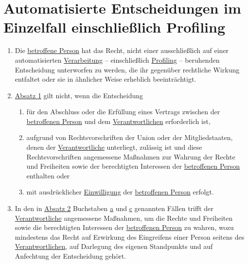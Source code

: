 \chapter{Automatisierte Entscheidungen im Einzelfall einschließlich Profiling}
\label{ch:22}


\begin{enumerate}

  \item Die \hyperref[itm:04-1]{betroffene Person} hat das Recht, nicht einer ausschließlich auf einer
   automatisierten \hyperref[itm:04-2]{Verarbeitung} -- einschließlich \hyperref[itm:04-4]{Profiling} -- beruhenden
   Entscheidung unterworfen zu werden, die ihr gegenüber rechtliche Wirkung entfaltet oder sie in ähnlicher Weise
   erheblich beeinträchtigt.
  \label{itm:22-1}

  \item \hyperref[itm:22-1]{Absatz 1} gilt nicht, wenn die Entscheidung
  \label{itm:22-2}

  \begin{enumerate}
  
    \item für den Abschluss oder die Erfüllung eines Vertrags zwischen der \hyperref[itm:04-1]{betroffenen Person} und
     dem \hyperref[itm:04-7]{Verantwortlichen} erforderlich ist,
    \label{itm:22-2a}

    \item aufgrund von Rechtsvorschriften der Union oder der Mitgliedstaaten, denen der \hyperref[itm:04-7]
     {Verantwortliche} unterliegt, zulässig ist und diese Rechtsvorschriften angemessene Maßnahmen zur Wahrung der
     Rechte und Freiheiten sowie der berechtigten Interessen der \hyperref[itm:04-1]{betroffenen Person} enthalten
     oder
    \label{itm:22-2b}

    \item mit ausdrücklicher \hyperref[itm:04-11]{Einwilligung} der \hyperref[itm:04-1]{betroffenen Person} erfolgt.
    \label{itm:22-2c}

  \end{enumerate}

  \item In den in \hyperref[itm:22-2]{Absatz 2} Buchstaben \hyperref[itm:22-2a]{a} und \hyperref[itm:22-2c]{c} genannten
   Fällen trifft der \hyperref[itm:04-7]{Verantwortliche} angemessene Maßnahmen, um die Rechte und Freiheiten sowie die
   berechtigten Interessen der \hyperref[itm:04-1]{betroffenen Person} zu wahren, wozu mindestens das Recht auf
   Erwirkung des Eingreifens einer Person seitens des \hyperref[itm:04-7]{Verantwortlichen}, auf Darlegung des eigenen
   Standpunkts und auf Anfechtung der Entscheidung gehört.
  \label{itm:22-3}


\end{enumerate}
